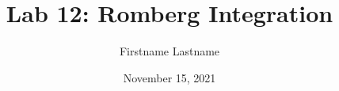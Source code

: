 \newcommand{\course}{MATH 3341}
\title{Lab 12: Romberg Integration}
\author{Firstname Lastname}
\date{November 15, 2021}
